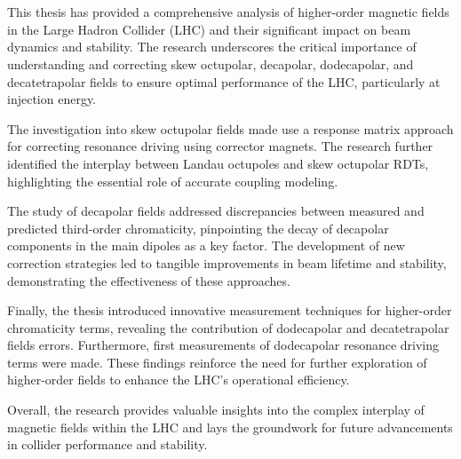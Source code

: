 \chapter{}
\label{chapter:conclusions}

This thesis has provided a comprehensive analysis of higher-order magnetic fields in the Large
Hadron Collider (LHC) and their significant impact on beam dynamics and stability. The research
underscores the critical importance of understanding and correcting skew octupolar, decapolar,
dodecapolar, and decatetrapolar fields to ensure optimal performance of the LHC, particularly at
injection energy.

The investigation into skew octupolar fields made use a response matrix approach for correcting
resonance driving using corrector magnets. The research further identified the interplay between
Landau octupoles and skew octupolar RDTs, highlighting the essential role of accurate coupling
modeling.

The study of decapolar fields addressed discrepancies between measured and predicted third-order
chromaticity, pinpointing the decay of decapolar components in the main dipoles as a key factor. The
development of new correction strategies led to tangible improvements in beam lifetime and
stability, demonstrating the effectiveness of these approaches.

Finally, the thesis introduced innovative measurement techniques for higher-order chromaticity
terms, revealing the contribution of dodecapolar and decatetrapolar fields errors. Furthermore,
first measurements of dodecapolar resonance driving terms were made.  These findings reinforce the
need for further exploration of higher-order fields to enhance the LHC's operational efficiency.

Overall, the research provides valuable insights into the complex interplay of magnetic fields
within the LHC and lays the groundwork for future advancements in collider performance and
stability.